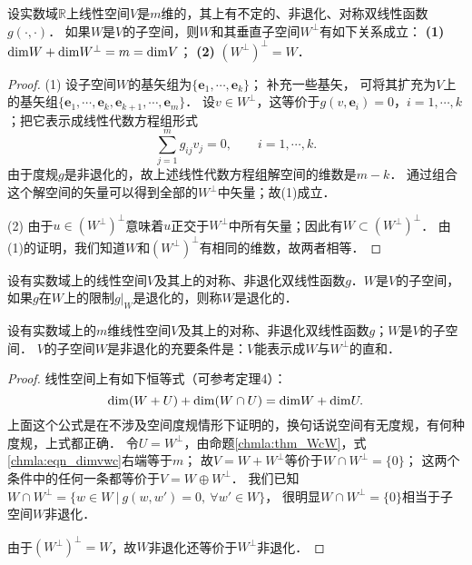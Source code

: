 \begin{proposition}\label{chmla:thm_WcW}
    设实数域$\mathbb{R}$上线性空间$V$是$m$维的，其上有不定的、非退化、对称双线性函数$g(\cdot,\cdot)$．
    如果$W$是$V$的子空间，则$W$和其{\kaishu 垂直子空间}$W^\perp$有如下关系成立：
    {\bfseries (1)} ${\rm dim} W + {\rm dim} W^\perp =m= {\rm dim} V$；
    {\bfseries (2)} $(W^\perp)^\perp = W$．
\end{proposition}
\begin{proof}
    (1) 设子空间$W$的基矢组为$\{\boldsymbol{e}_1,\cdots,\boldsymbol{e}_k\}$； 补充一些基矢，
    可将其扩充为$V$上的基矢组$\{\boldsymbol{e}_1,\cdots,\boldsymbol{e}_k,  \boldsymbol{e}_{k+1},\cdots,\boldsymbol{e}_m\}$．
    设$v\in W^\perp$，这等价于$g(v,\boldsymbol{e}_i)=0$，$i=1,\cdots,k$；把它表示成线性代数方程组形式
    \begin{equation}
        \sum_{j=1}^{m} g_{ij} v_j =0 , \qquad i=1,\cdots,k .
    \end{equation}
    由于度规$g$是非退化的，故上述线性代数方程组解空间的维数是$m-k$．
    通过组合这个解空间的矢量可以得到全部的$W^\perp$中矢量；故(1)成立．
    
    (2) 由于$u\in (W^\perp)^\perp$意味着$u$正交于$W^\perp$中所有矢量；因此有$W\subset (W^\perp)^\perp$．
    由(1)的证明，我们知道$W$和$(W^\perp)^\perp$有相同的维数，故两者相等．
\end{proof}


\begin{definition}\label{chmla:def_degenerate}
    设有实数域上的线性空间$V$及其上的对称、非退化双线性函数$g$．$W$是$V$的子空间，
    如果$g$在$W$上的限制$g|_W$是退化的，则称$W$是{\heiti 退化}的．
\end{definition}



\begin{proposition}\label{chmla:thm_wdwp}
    设有实数域上的$m$维线性空间$V$及其上的对称、非退化双线性函数$g$；$W$是$V$的子空间．
    $V$的子空间$W$是非退化的充要条件是：$V$能表示成$W$与$W^\perp$的直和．
\end{proposition}
\begin{proof}
    线性空间上有如下恒等式（可参考\parencite[p.184]{qiuws-2019-v2}定理4）：
    \begin{equation}\label{chmla:eqn_dimvwc}
        {\rm dim}(W+U) + {\rm dim}(W\cap U) = {\rm dim} W + {\rm dim} U .
    \end{equation}
    上面这个公式是在不涉及空间度规情形下证明的，换句话说空间有无度规，有何种度规，上式都正确．
    令$U=W^\perp$，由命题\ref{chmla:thm_WcW}，式\eqref{chmla:eqn_dimvwc}右端等于$m$；
    故$V=W+ W^\perp$等价于$W\cap W^\perp=\{0\}$；
    这两个条件中的任何一条都等价于$V=W\oplus W^\perp$．
    我们已知$W\cap W^\perp=\{w\in W \ |\ g(w,w')=0,\ \forall w'\in W \}$，
    很明显$W\cap W^\perp=\{0\}$相当于子空间$W$非退化．
    
    由于$(W^\perp)^\perp=W$，故$W$非退化还等价于$W^\perp$非退化．
\end{proof}



